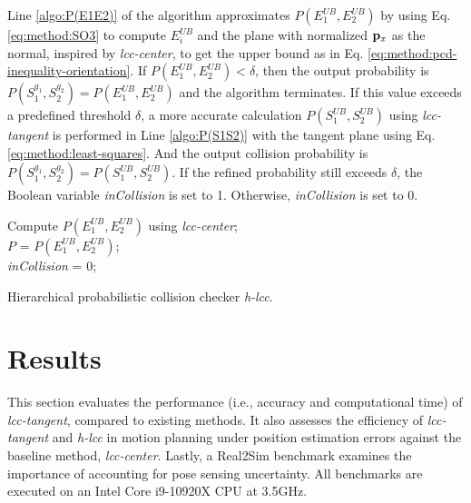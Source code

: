 \documentclass[conference]{IEEEtran}
\newcommand{\pp}{{\bf p}}
\begin{document}
Line \ref{algo:P(E1E2)} of the algorithm approximates $P(E_1^{UB}, E_2^{UB})$ by using Eq. \ref{eq:method:SO3} to compute $E_i^{UB}$ and the plane with normalized $\pp_x$ as the normal, inspired by \textit{lcc-center}, to get the upper bound as in Eq. \ref{eq:method:pcd-inequality-orientation}. If $P(E_1^{UB}, E_2^{UB})<\delta$, then the output probability is $P(S_1^{g_1}, S_2^{g_2})=P(E_1^{UB}, E_2^{UB})$ and the algorithm terminates. If this value exceeds a predefined threshold $\delta$, a more accurate calculation $P(S_1^{UB}, S_2^{UB})$ using \textit{lcc-tangent} is performed in Line \ref{algo:P(S1S2)} with the tangent plane using Eq.\ref{eq:method:least-squares}. And the output collision probability is $P(S_1^{g_1}, S_2^{g_2})=P(S_1^{UB}, S_2^{UB})$. If the refined probability still exceeds $\delta$, the Boolean variable \textit{inCollision} is set to 1. Otherwise, \textit{inCollision} is set to 0.

\begin{algorithm}[tb]
\SetAlgoLined
{}
\In{$S_1^{UB}, S_2^{UB}, E_1^{UB}, E_2^{UB}, \mathcal{N}(\pp_x, \Sigma_x), \delta$}
Compute $P(E_1^{UB}, E_2^{UB})$ using \textit{lcc-center}; \label{algo:P(E1E2)} \\
{
$P$ = $P(E_1^{UB}, E_2^{UB})$;\\
\textit{inCollision} = $0$; \\
}
\caption{Hierarchical probabilistic collision checker \textit{h-lcc}.}
\label{algo:h-lcc}
\end{algorithm}




\section{Results}

This section evaluates the performance (i.e., accuracy and computational time) of \textit{lcc-tangent}, compared to existing methods. It also assesses the efficiency of \textit{lcc-tangent} and \textit{h-lcc} in motion planning under position estimation errors against the baseline method, \textit{lcc-center}. Lastly, a Real2Sim benchmark examines the importance of accounting for pose sensing uncertainty. All benchmarks are executed on an Intel Core i9-10920X CPU at 3.5GHz.
\end{document}
